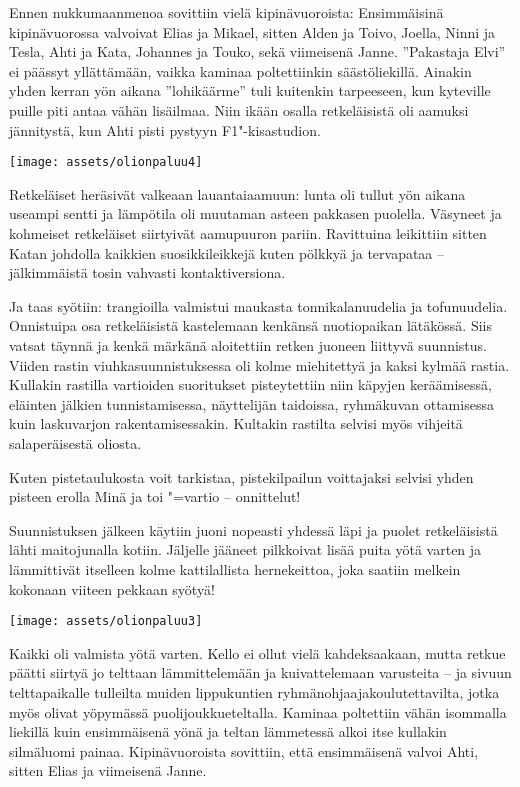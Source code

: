 \begin{multicols}{2}
	Ennen nukkumaanmenoa sovittiin vielä kipinävuoroista: Ensimmäisinä
	kipinävuorossa valvoivat Elias ja Mikael, sitten Alden ja Toivo,
	Joella, Ninni ja Tesla, Ahti ja Kata, Johannes ja Touko, sekä
	viimeisenä Janne. ''Pakastaja Elvi'' ei päässyt yllättämään, vaikka
	kaminaa poltettiinkin säästöliekillä. Ainakin yhden kerran yön aikana
	''lohikäärme'' tuli kuitenkin tarpeeseen, kun kyteville puille piti antaa
	vähän lisäilmaa. Niin ikään osalla retkeläisistä oli aamuksi
	jännitystä, kun Ahti pisti pystyyn F1"-kisastudion.

	\vspace*{0.16cm}
	\noindent\texttt{[image: assets/olionpaluu4]}

	Retkeläiset heräsivät valkeaan lauantaiaamuun: lunta oli tullut yön
	aikana useampi sentti ja lämpötila oli muutaman asteen pakkasen
	puolella. Väsyneet ja kohmeiset retkeläiset siirtyivät aamupuuron
	pariin. Ravittuina leikittiin sitten Katan johdolla kaikkien
	suosikkileikkejä kuten pölkkyä ja tervapataa -- jälkimmäistä tosin
	vahvasti kontaktiversiona. 

	Ja taas syötiin: trangioilla valmistui maukasta tonnikalanuudelia ja
	tofunuudelia. Onnistuipa osa retkeläisistä kastelemaan kenkänsä
	nuotiopaikan lätäkössä. Siis vatsat täynnä ja kenkä märkänä aloitettiin
	retken juoneen liittyvä suunnistus. Viiden rastin viuhkasuunnistuksessa
	oli kolme miehitettyä ja kaksi kylmää rastia. Kullakin rastilla
	vartioiden suoritukset pisteytettiin niin käpyjen keräämisessä,
	eläinten jälkien tunnistamisessa, näyttelijän taidoissa, ryhmäkuvan
	ottamisessa kuin laskuvarjon rakentamisessakin. Kultakin rastilta
	selvisi myös vihjeitä salaperäisestä oliosta. 

	Kuten pistetaulukosta voit tarkistaa, pistekilpailun voittajaksi
	selvisi yhden pisteen erolla Minä ja toi "=vartio -- onnittelut!

	Suunnistuksen jälkeen käytiin juoni nopeasti yhdessä läpi ja puolet
	retkeläisistä lähti maitojunalla kotiin. Jäljelle jääneet pilkkoivat
	lisää puita yötä varten ja lämmittivät itselleen kolme kattilallista
	hernekeittoa, joka saatiin melkein kokonaan viiteen pekkaan syötyä!

	\vspace*{0.08cm}
	\noindent\texttt{[image: assets/olionpaluu3]}

	Kaikki oli valmista yötä varten. Kello ei ollut vielä kahdeksaakaan,
	mutta retkue päätti siirtyä jo telttaan lämmittelemään ja
	kuivattelemaan varusteita -- ja sivuun telttapaikalle tulleilta muiden
	lippukuntien ryhmänohjaajakoulutettavilta, jotka myös olivat yöpymässä
	puolijoukkueteltalla. Kaminaa poltettiin vähän isommalla liekillä kuin
	ensimmäisenä yönä ja teltan lämmetessä alkoi itse kullakin silmäluomi
	painaa. Kipinävuoroista sovittiin, että ensimmäisenä valvoi Ahti,
	sitten Elias ja viimeisenä Janne. 


\end{multicols}
